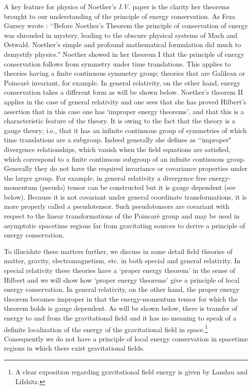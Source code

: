 \documentclass[12pt]{article}
\begin{document}
A key feature for physics of Noether's {\it{I.V.}} paper is the clarity 
 her theorems brought to our understanding of the principle of
energy conservation. As Feza Gursey wrote \cite{feza}: \lq\lq Before Noether's Theorem the principle of conservation of energy was shrouded in
      mystery, leading to the obscure physical systems of Mach and Ostwald. Noether's simple and
      profound mathematical formulation did much to demystify physics."
Noether showed in her theorem I that the principle of energy conservation follows
from symmetry under time translations. This applies to theories
having a finite continuous symmetry group; theories that are Galilean or
Poincar\`{e} invariant, for example.
In general relativity,
on the other hand, 
energy conservation takes a different form as will be shown
below. Noether's theorem II applies in the case of general relativity
and one sees that she has proved Hilbert's assertion that in this case one
has  `improper energy theorems', and that this is a characteristic
feature of the theory.  It is owing to the fact that the  
theory is a gauge theory; i.e., that it has an infinite continuous
group of symmetries of which time translations are a subgroup. Indeed 
generally she defines as \lq\lq improper"
 divergence relationships, which vanish when the field equations are satisfied, 
which  correspond to a finite continuous subgroup of an infinite continuous group.
Generally they
do not have the required invariance or covariance properties under the
larger group. For example,
in general relativity a divergence
free energy-momentum (pseudo) tensor can be constructed but it is
gauge dependent (see below). Because  it is not covariant under general coordinate
transformations, it is more properly called  a pseudotensor. 
Such pseudotensors are covariant with respect to the linear transformations of the Poincar\`{e} group and may be used
in  asymptotic spacetime regions far from gravitating sources to derive a principle of
energy conservation.\cite{c&w}


To illucidate these matters further, we discuss in some detail 
  field theories of matter, gravity, electromagnetism, etc. in both
special and general relativity.  In special relativity these theories have a
`proper energy theorem' in the sense of Hilbert and we will show how `proper energy theorems' give a
principle of
local energy conservation.   In general relativity, on the other hand,
the proper energy theorem becomes improper in that the energy-momentum
tensor for which the theorem holds is gauge dependent. As will be shown
below,
there is transfer
of energy to and from the gravitational field and it has no meaning
to speak of a definite localization
of the energy of the gravitational field in space.\footnote{A 
clear exposition regarding gravitational field energy is given by Landau and Lifshitz\cite{L&L}.} Consequently we do not have a principle of local
energy conservation in spacetime regions in which there exist gravitational
fields.
\end{document}

